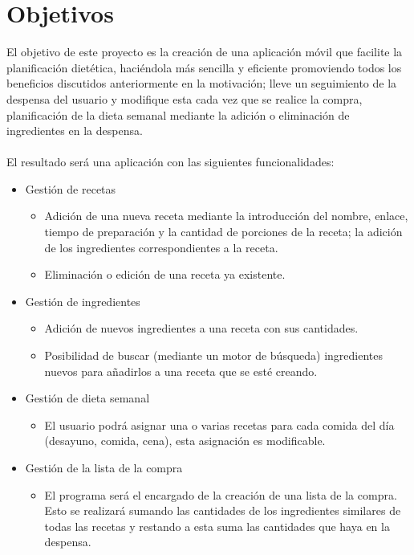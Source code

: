\documentclass[12pt,a4paper]{report} %
\begin{document}
	\section*{Objetivos}
	
	El objetivo de este proyecto es la creación de una aplicación móvil que facilite la planificación dietética, haciéndola más sencilla y eficiente promoviendo todos los beneficios discutidos anteriormente en la motivación; lleve un seguimiento de la despensa del usuario y modifique esta cada vez que se realice la compra, planificación de la dieta semanal mediante la adición o eliminación de ingredientes en la despensa.
	\\
	\\
	El resultado será una aplicación con las siguientes funcionalidades:
	
	
	\begin{itemize}
		\item Gestión de recetas
		\begin{itemize}
			\item Adición de una nueva receta mediante la introducción del nombre, enlace, tiempo de preparación y la cantidad de porciones de la receta; la adición de los ingredientes correspondientes a la receta.
			\item Eliminación o edición de una receta ya existente.
		\end{itemize}
		
		\item Gestión de ingredientes
		\begin{itemize}
			\item Adición de nuevos ingredientes a una receta con sus cantidades.
			\item Posibilidad de buscar (mediante un motor de búsqueda) ingredientes nuevos para añadirlos a una receta que se esté creando.
		\end{itemize}
		
		\item Gestión de dieta semanal
		\begin{itemize}
			\item El usuario podrá asignar una o varias recetas para cada comida del día (desayuno, comida, cena), esta asignación es modificable.
		\end{itemize}
		
		\item Gestión de la lista de la compra
		\begin{itemize}
			\item El programa será el encargado de la creación de una lista de la compra. Esto se realizará sumando las cantidades de los ingredientes similares de todas las recetas y restando a esta suma las cantidades que haya en la despensa.
		\end{itemize}
	\end{itemize}
\end{document}
